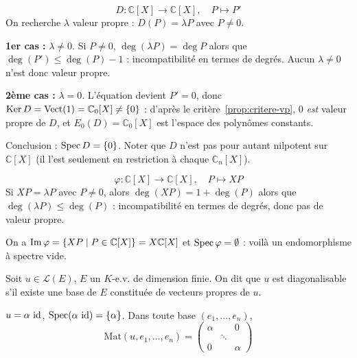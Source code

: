 \begin{exemple}[Dérivation]
\[D : \mathbb{C}[X]\to\mathbb{C}[X], \quad P\mapsto P'\]
On recherche $\lambda$ valeur propre : $D(P)=\lambda P$ avec $P\neq 0$.

\textbf{1er cas :} $\lambda\neq 0$. Si $P\neq 0$, $\deg(\lambda P)=\deg P$ alors que $\deg(P')\leq \deg(P)-1$ : incompatibilité en termes de degrés. Aucun $\lambda\neq 0$ n'est donc valeur propre.

\textbf{2ème cas :} $\lambda=0$. L'équation devient $P'=0$, donc $\operatorname{Ker} D = \operatorname{Vect}(1) = \mathbb{C}_0[X] \neq \{0\}$ : d'après le critère~\ref{prop:critere-vp}, $0$ \emph{est} valeur propre de $D$, et $E_0(D)=\mathbb{C}_0[X]$ est l'espace des polynômes constants.

Conclusion : $\operatorname{Spec} D = \{0\}$. Noter que $D$ n'est pas pour autant nilpotent sur $\mathbb{C}[X]$ (il l'est seulement en restriction à chaque $\mathbb{C}_n[X]$).
\end{exemple}

\begin{exemple}
\label{ex:XP}
\[\varphi : \mathbb{C}[X]\to\mathbb{C}[X], \quad P\mapsto XP\]
Si $XP=\lambda P$ avec $P\neq 0$, alors $\deg(XP)=1+\deg(P)$ alors que $\deg(\lambda P)\leq \deg(P)$ : incompatibilité en termes de degrés, donc pas de valeur propre.

On a $\operatorname{Im}\varphi = \{XP \mid P\in\mathbb{C}[X]\} = X\mathbb{C}[X]$ et $\operatorname{Spec}\varphi = \emptyset$ : voilà un endomorphisme à spectre vide.
\end{exemple}

\begin{defi}[Diagonalisabilité]
\label{defi:diagonalisable}
Soit $u\in\mathcal{L}(E)$, $E$ un $K$-e.v. de dimension finie. On dit que $u$ est diagonalisable s'il existe une base de $E$ constituée de vecteurs propres de $u$.
\end{defi}

\begin{exemple}
$u=\alpha\, \operatorname{id}$, $\operatorname{Spec}(\alpha\, \operatorname{id})=\{\alpha\}$. Dans toute base $(e_1,\dots,e_n)$,
\[\mathrm{Mat}(u,e_1,\dots,e_n) = \begin{pmatrix} \alpha & & 0 \\ & \ddots & \\ 0 & & \alpha\end{pmatrix}\]
\end{exemple}

